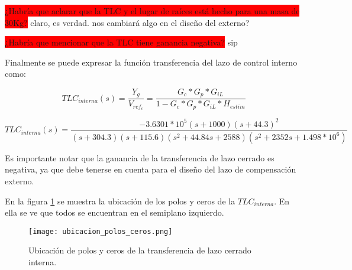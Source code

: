 \colorbox{red}{¿Habría que aclarar que la TLC y el lugar de raíces está hecho para una masa de 30Kg?} claro, es verdad. nos cambiará algo en el diseño del externo?

\colorbox{red}{¿Habría que mencionar que la TLC tiene ganancia negativa?} sip


Finalmente se puede expresar la función transferencia del lazo de control interno como:
%


\begin{equation}
	TLC_{interna}(s)=\frac{Y_g}{V_{ref_c}}=\frac{G_c*G_{p}*G_{iL}}{1-G_c*G_{p}*G_{iL}*H_{estim}}
\end{equation}

\begin{equation*}
	TLC_{interna}(s)=\frac{-3.6301*10^5(s+1000)(s+44.3)^2}{(s+304.3) (s+115.6) (s^2 + 44.84s + 2588) (s^2 + 2352s + 1.498*10^6)}	
\end{equation*}

Es importante notar que la ganancia de la transferencia de lazo cerrado es negativa, ya que debe tenerse en cuenta para el diseño del lazo de compensación externo.

En la figura \ref{fig:ubicacion_polos_y_ceros} se muestra la ubicación de los polos y ceros de la $TLC_{interna}$. En ella se ve que todos se encuentran en el semiplano izquierdo. 

\begin{figure}[H]
	\centering
	\texttt{[image: ubicacion\_polos\_ceros.png]}
	\caption{Ubicación de polos y ceros de la transferencia de lazo cerrado interna.}
	\label{fig:ubicacion_polos_y_ceros}
\end{figure}
%
%

